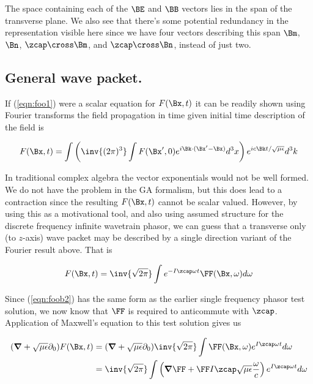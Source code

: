 The space containing each of the $\BE$ and $\BB$ vectors lies in the span of the transverse plane.  We also see that there's some potential redundancy in the representation visible here since we have four vectors describing this span $\Bm$, $\Bn$, $\zcap \cross \Bm$, and $\zcap \cross \Bn$, instead of just two.

\subsection{General wave packet.}

If (\ref{eqn:foo1}) were a scalar equation for $F(\Bx,t)$ it can be readily shown using Fourier transforms the field propagation in time given initial time description of the field is 

\begin{align}\label{eqn:foob1}
F(\Bx, t) = \int \left( \inv{(2\pi)^3} \int F(\Bx', 0) e^{i\Bk \cdot (\Bx' -\Bx)} d^3 x \right) e^{i c \Bk t/ \sqrt{\mu\epsilon}} d^3 k
\end{align}

In traditional complex algebra the vector exponentials would not be well formed.  We do not have the problem in the GA formalism, but this does lead to a contraction since the resulting $F(\Bx,t)$ cannot be scalar valued.  However, by using this as a motivational tool, and 
also using assumed structure for the discrete frequency infinite wavetrain phasor, we can guess that a transverse only (to $z$-axis) wave packet may be described by a single direction variant of the Fourier result above.  That is

\begin{align}\label{eqn:foob2}
F(\Bx, t) = 
\inv{\sqrt{2\pi}} \int 
e^{-I \zcap \omega t} 
\FF(\Bx, \omega)
d\omega
\end{align}

Since (\ref{eqn:foob2}) has the same form as the earlier single frequency phasor test solution, we now know that $\FF$ is required to anticommute with $\zcap$.  Application of Maxwell's equation to this test solution gives us

\begin{align*}
(\spacegrad +\sqrt{\mu\epsilon} \partial_0) F(\Bx,t) &=
(\spacegrad +\sqrt{\mu\epsilon} \partial_0) 
\inv{\sqrt{2\pi}} \int 
\FF(\Bx, \omega)
e^{I \zcap \omega t} 
d\omega \\
&=
\inv{\sqrt{2\pi}}\int
\left(\spacegrad \FF + \FF I \zcap \sqrt{\mu\epsilon} \frac{\omega}{c}\right) 
e^{I \zcap \omega t} 
d\omega
\end{align*}

